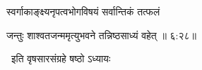 \nemslokac

{\devanagarifont स्वर्गाकाङ्क्ष्यनृपत्वभोगविषयं सर्वान्तिकं तत्फलं }%
  \dontdisplaylinenum    {}%



\nemslokad

{\devanagarifont जन्तुः शाश्वतजन्ममृत्युभवने तन्निष्ठसाध्यं वहेत् {॥ ६:२८॥} \veg\dontdisplaylinenum }%

\vers


{\devanagarifont 
\jump
\begin{center}
\ketdanda~इति वृषसारसंग्रहे षष्ठो ऽध्यायः~\ketdanda
\end{center}
\dontdisplaylinenum\vers  }%
 